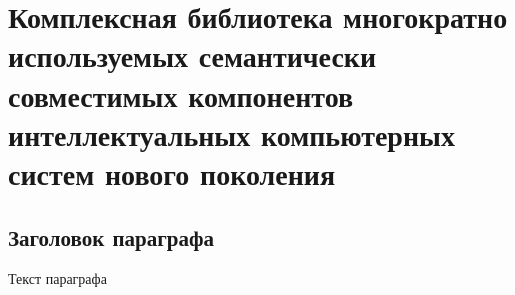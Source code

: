 
\chapter{Комплексная библиотека многократно используемых семантически совместимых компонентов интеллектуальных компьютерных систем нового поколения}
\label{chapter_library}


\section{Заголовок параграфа}
Текст параграфа

%